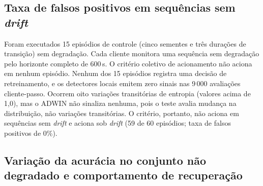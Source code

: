 \documentclass[conference]{IEEEtran}
\begin{document}
\subsection{Taxa de falsos positivos em sequências sem \textit{drift}}
Foram executados 15 episódios de controle (cinco sementes e três durações de transição) sem degradação. Cada cliente monitora uma sequência sem degradação pelo horizonte completo de 600\,s. O critério coletivo de acionamento não aciona em nenhum episódio. Nenhum dos 15 episódios registra uma decisão de retreinamento, e os detectores locais emitem zero sinais nas 9\,000 avaliações cliente-passo. Ocorrem oito variações transitórias de entropia (valores acima de 1,0), mas o ADWIN não sinaliza nenhuma, pois o teste avalia mudança na distribuição, não variações transitórias. O critério, portanto, não aciona em sequências sem \textit{drift} e aciona sob \textit{drift} (59 de 60 episódios; taxa de falsos positivos de 0\%).

\subsection{Variação da acurácia no conjunto não degradado e comportamento de recuperação}
\begin{table}[!t]
\centering
\caption{Variação da acurácia no conjunto não degradado $\Delta$ (ReaQI; média por grupo $\pm$ desvio-padrão sobre 5 sementes).}
\label{tab:retention}
\end{table}
\end{document}
